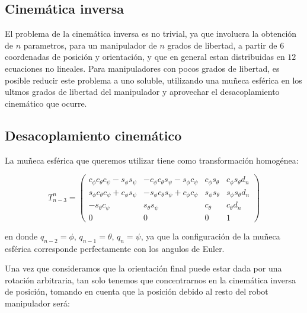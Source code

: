 \begin{multicols*}{3}

        \subsection{Cinemática inversa}

            El problema de la cinemática inversa es no trivial, ya que involucra la obtención de $n$ parametros, para un manipulador de $n$ grados de libertad, a partir de $6$ coordenadas de posición y orientación, y que en general estan distribuidas en $12$ ecuaciones no lineales. Para manipuladores con pocos grados de libertad, es posible reducir este problema a uno soluble, utilizando una muñeca esférica en los ultmos grados de libertad del manipulador y aprovechar el desacoplamiento cinemático que ocurre.


        \subsection{Desacoplamiento cinemático}

            La muñeca esférica que queremos utilizar tiene como transformación homogénea:

            \begin{equation}
                T_{n-3}^n =
                \begin{pmatrix}
                    c_{\phi} c_{\theta} c_{\psi} - s_{\phi} s_{\psi} & - c_{\phi} c_{\theta} s_{\psi} - s_{\phi} c_{\psi} & c_{\phi} s_{\theta} & c_{\phi} s_{\theta} d_n \\
                    s_{\phi} c_{\theta} c_{\psi} + c_{\phi} s_{\psi} & - s_{\phi} c_{\theta} s_{\psi} + c_{\phi} c_{\psi} & s_{\phi} s_{\theta} & s_{\phi} s_{\theta} d_n \\
                    - s_{\theta} c_{\psi} & s_{\theta} s_{\psi} & c_{\theta} & c_{\theta} d_n \\
                    0 & 0 & 0 & 1
                \end{pmatrix}
            \end{equation}

            en donde $q_{n-2} = \phi$, $q_{n-1} = \theta$, $q_{n} = \psi$, ya que la configuración de la muñeca esférica corresponde perfectamente con los angulos de Euler.

            Una vez que consideramos que la orientación final puede estar dada por una rotación arbitraria, tan solo tenemos que concentrarnos en la cinemática inversa de posición, tomando en cuenta que la posición debido al resto del robot manipulador será:


\end{multicols*}
